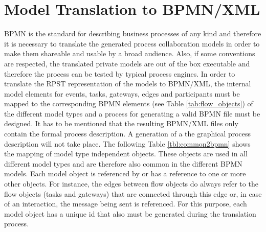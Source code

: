 \section{Model Translation to BPMN/XML} \label{sec:bpmntranslation}
BPMN is the standard for describing business processes of any kind and therefore it is necessary to translate the generated process collaboration models in order to make them shareable and usable by a broad audience. Also, if some conventions are respected, the translated private models are out of the box executable and therefore the process can be tested by typical process engines. In order to translate the RPST representation of the models to BPMN/XML, the internal model elements for events, tasks, gateways, edges and participants must be mapped to the corresponding BPMN elements (see Table \ref{tab:flow_objects}) of the different model types and a process for generating a valid BPMN file must be designed. It has to be mentioned that the resulting BPMN/XML files only contain the formal process description. A generation of a the graphical process description will not take place. The following Table \ref{tbl:common2bpmn} shows the mapping of model type independent objects. These objects are used in all different model types and are therefore also common in the different BPMN models. Each model object is referenced by or has a reference to one or more other objects. For instance, the edges between flow objects do always refer to the flow objects (tasks and gateways) that are connected through this edge or, in case of an interaction, the message being sent is referenced. For this purpose, each model object has a unique id that also must be generated during the translation process.\\


